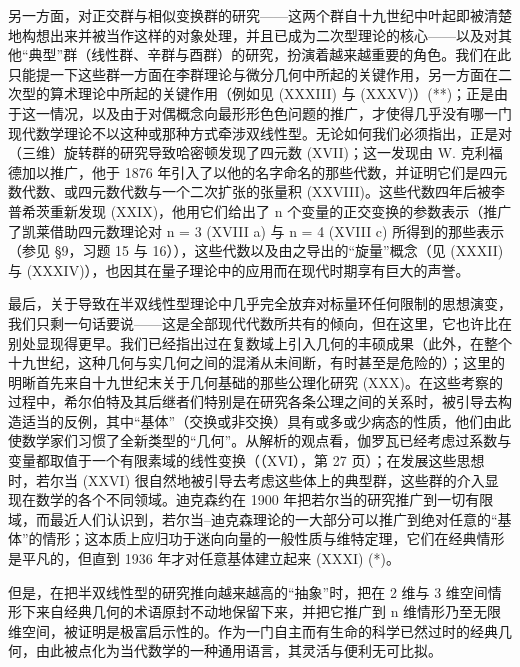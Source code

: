 另一方面，对正交群与相似变换群的研究——这两个群自十九世纪中叶起即被清楚地构想出来并被当作这样的对象处理，并且已成为二次型理论的核心——以及对其他“典型”群（线性群、辛群与酉群）的研究，扮演着越来越重要的角色。我们在此只能提一下这些群一方面在李群理论与微分几何中所起的关键作用，另一方面在二次型的算术理论中所起的关键作用（例如见 (XXXIII) 与 (XXXV)）(**)；正是由于这一情况，以及由于对偶概念向最形形色色问题的推广，才使得几乎没有哪一门现代数学理论不以这种或那种方式牵涉双线性型。无论如何我们必须指出，正是对（三维）旋转群的研究导致哈密顿发现了四元数 (XVII)；这一发现由 W. 克利福德加以推广，他于 1876 年引入了以他的名字命名的那些代数，并证明它们是四元数代数、或四元数代数与一个二次扩张的张量积 (XXVIII)。这些代数四年后被李普希茨重新发现 (XXIX)，他用它们给出了 n 个变量的正交变换的参数表示（推广了凯莱借助四元数理论对 n = 3 (XVIII a) 与 n = 4 (XVIII c) 所得到的那些表示（参见 §9，习题 15 与 16）），这些代数以及由之导出的“旋量”概念（见 (XXXII) 与 (XXXIV)），也因其在量子理论中的应用而在现代时期享有巨大的声誉。

最后，关于导致在半双线性型理论中几乎完全放弃对标量环任何限制的思想演变，我们只剩一句话要说——这是全部现代代数所共有的倾向，但在这里，它也许比在别处显现得更早。我们已经指出过在复数域上引入几何的丰硕成果（此外，在整个十九世纪，这种几何与实几何之间的混淆从未间断，有时甚至是危险的）；这里的明晰首先来自十九世纪末关于几何基础的那些公理化研究 (XXX)。在这些考察的过程中，希尔伯特及其后继者们特别是在研究各条公理之间的关系时，被引导去构造适当的反例，其中“基体”（交换或非交换）具有或多或少病态的性质，他们由此使数学家们习惯了全新类型的“几何”。从解析的观点看，伽罗瓦已经考虑过系数与变量都取值于一个有限素域的线性变换（（XVI），第 27 页）；在发展这些思想时，若尔当 (XXVI) 很自然地被引导去考虑这些体上的典型群，这些群的介入显现在数学的各个不同领域。迪克森约在 1900 年把若尔当的研究推广到一切有限域，而最近人们认识到，若尔当–迪克森理论的一大部分可以推广到绝对任意的“基体”的情形；这本质上应归功于迷向向量的一般性质与维特定理，它们在经典情形是平凡的，但直到 1936 年才对任意基体建立起来 (XXXI) (*)。

但是，在把半双线性型的研究推向越来越高的“抽象”时，把在 2 维与 3 维空间情形下来自经典几何的术语原封不动地保留下来，并把它推广到 n 维情形乃至无限维空间，被证明是极富启示性的。作为一门自主而有生命的科学已然过时的经典几何，由此被点化为当代数学的一种通用语言，其灵活与便利无可比拟。

